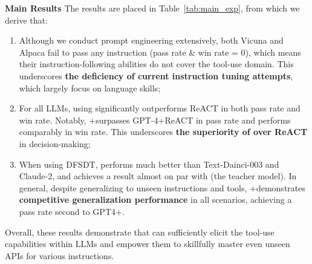 \textbf{Main Results} \quad
The results are placed in Table~\ref{tab:main_exp}, from which we derive that: 
\begin{enumerate}[topsep=1pt, partopsep=1pt, leftmargin=12pt, itemsep=-1pt]
    \item Although we conduct prompt engineering extensively, both Vicuna and Alpaca fail to pass any instruction (pass rate \& win rate = 0), which means their instruction-following abilities do not cover the tool-use domain. This underscores \textbf{the deficiency of current instruction tuning attempts}, which largely focus on language skills;
    \item For all LLMs, using \dfs significantly outperforms ReACT in both pass rate and win rate. Notably, \turbo+\dfs surpasses GPT-4+ReACT in pass rate and performs comparably in win rate. This underscores \textbf{the superiority of \dfs over ReACT} in decision-making;
    \item When using DFSDT, \ourmodel performs much better than Text-Dainci-003 and Claude-2, and achieves a result almost on par with \turbo (the teacher model). In general, despite generalizing to unseen instructions and tools, \ourmodel+\dfs demonstrates \textbf{competitive generalization performance} in all scenarios, achieving a pass rate second to GPT4+\dfs.
\end{enumerate}
Overall, these results demonstrate that \ourdata can sufficiently elicit the tool-use capabilities within LLMs and empower them to skillfully master even unseen APIs for various instructions.







